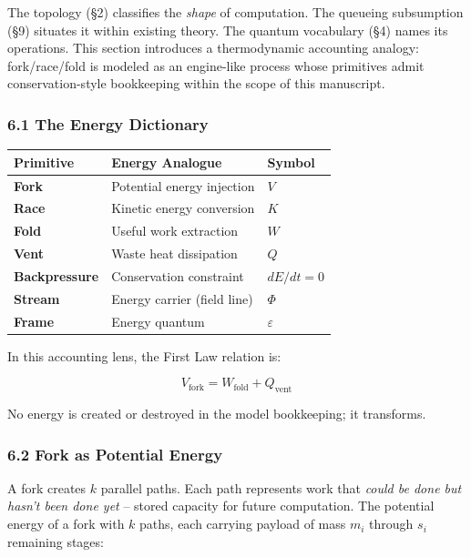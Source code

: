 \documentclass[
  11pt,
]{article}
\newcounter{none} %
\begin{document}
The topology (§2) classifies the \emph{shape} of computation. The
queueing subsumption (§9) situates it within existing theory. The
quantum vocabulary (§4) names its operations. This section introduces a
thermodynamic accounting analogy: fork/race/fold is modeled as an
engine-like process whose primitives admit conservation-style
bookkeeping within the scope of this manuscript.

\subsubsection{6.1 The Energy Dictionary}\label{the-energy-dictionary}

{\def\LTcaptype{none} %
\begin{longtable}[]{@{}lll@{}}
\toprule\noalign{}
Primitive & Energy Analogue & Symbol \\
\midrule\noalign{}
\endhead
\bottomrule\noalign{}
\endlastfoot
\textbf{Fork} & Potential energy injection & \(V\) \\
\textbf{Race} & Kinetic energy conversion & \(K\) \\
\textbf{Fold} & Useful work extraction & \(W\) \\
\textbf{Vent} & Waste heat dissipation & \(Q\) \\
\textbf{Backpressure} & Conservation constraint & \(dE/dt = 0\) \\
\textbf{Stream} & Energy carrier (field line) & \(\Phi\) \\
\textbf{Frame} & Energy quantum & \(\varepsilon\) \\
\end{longtable}
}

In this accounting lens, the First Law relation is:

\[
V_{\text{fork}} = W_{\text{fold}} + Q_{\text{vent}}
\]

No energy is created or destroyed in the model bookkeeping; it
transforms.

\subsubsection{6.2 Fork as Potential
Energy}\label{fork-as-potential-energy}

A fork creates \(k\) parallel paths. Each path represents work that
\emph{could be done but hasn't been done yet} -- stored capacity for
future computation. The potential energy of a fork with \(k\) paths,
each carrying payload of mass \(m_i\) through \(s_i\) remaining stages:
\end{document}
